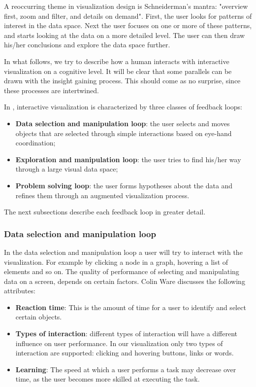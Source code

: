 A reoccurring theme in visualization design is Schneiderman's mantra: "overview first, zoom and filter, and details on demand"\cite{keim:2002, shirley:2009, ware:2004}. First, the user looks for patterns of interest in the data space. Next the user focuses on one or more of these patterns, and starts looking at the data on a more detailed level. The user can then draw his/her conclusions and explore the data space further\cite{keim:2002}. 

In what follows, we try to describe how a human interacts with interactive visualization on a cognitive level. It will be clear that some parallels can be drawn with the insight gaining process. This should come as no surprise, since these processes are intertwined\cite{keim:2002, ware:2004, yi:2008}.

In \cite{ware:2004}, interactive visualization is characterized by three classes of feedback loops:

\begin{itemize}
	\item \textbf{Data selection and manipulation loop}: the user selects and moves objects that are selected through simple interactions based on eye-hand coordination;
	\item \textbf{Exploration and manipulation loop}: the user tries to find his/her way through a large visual data space;
	\item \textbf{Problem solving loop}: the user forms hypotheses about the data and refines them through an augmented visualization process.
\end{itemize}

The next subsections describe each feedback loop in greater detail.


\subsubsection{Data selection and manipulation loop}\label{subsubsection:data_manipulation_loop}

In the data selection and manipulation loop a user will try to interact with the visualization. For example by clicking a node in a graph, hovering a list of elements and so on. The quality of performance of selecting and manipulating data on a screen, depends on certain factors. Colin Ware discusses the following attributes:

\begin{itemize}
	\item \textbf{Reaction time}: This is the amount of time for a user to identify and select certain objects.
	\item \textbf{Types of interaction}: different types of interaction will have a different influence on user performance. In our visualization only two types of interaction are supported: clicking and hovering buttons, links or words.
	\item \textbf{Learning}: The speed at which a user performs a task may decrease over time, as the user becomes more skilled at executing the task.
\end{itemize}

